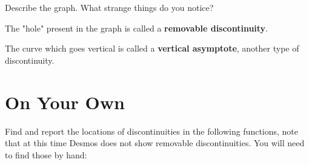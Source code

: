 \documentclass{ximera}
\begin{document}
\begin{question}
Describe the graph. What strange things do you notice?
\begin{freeResponse}
\end{freeResponse}
\end{question}
The "hole" present in the graph is called a \textbf{removable discontinuity}.

The curve which goes vertical is called a \textbf{vertical asymptote}, another type of discontinuity.

\section{On Your Own}

Find and report the locations of discontinuities in the following functions, note that at this time Desmos does not show removable discontinuities. You will need to find those by hand:
\end{document}
